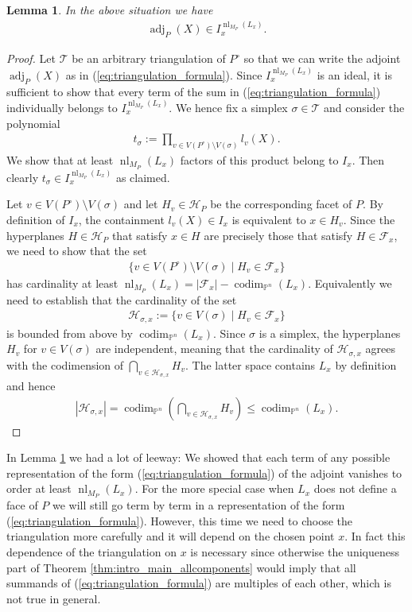 \documentclass[a4paper,10pt]{amsart}
\theoremstyle{definition}
\theoremstyle{plain}
\newtheorem{lem}[defin]{Lemma}
\newcommand{\codim}{\operatorname{codim}}
\newcommand{\adj}{\operatorname{adj}} %
\newcommand{\nl}{\operatorname{nl}}
\newcommand{\cF}{{\mathcal F}}
\newcommand{\cH}{{\mathcal H}}
\newcommand{\cT}{{\mathcal T}}
\newcommand{\pp}{\mathbb{P}}
\begin{document}
\begin{lem}
\label{lem:existence_weak_vanishing}
    In the above situation we have 
    \begin{align*}
        \adj_P(X)\in I_x^{\nl_{M_P}(L_x)}.
     \end{align*}
\end{lem}
\begin{proof}
    Let $\cT$ be an arbitrary triangulation of $P^\circ$ so that we can write the adjoint $\adj_P(X)$ as in (\ref{eq:triangulation_formula}). Since $I_x^{\nl_{M_P}(L_x)}$ is an ideal, it is sufficient to show that every term of the sum in  (\ref{eq:triangulation_formula}) individually belongs to $I_x^{\nl_{M_P}(L_x)}$. We hence fix a simplex $\sigma \in \cT$ and consider the polynomial \begin{align*}
        t_\sigma:=\prod_{v\in V(P^\circ)\setminus V(\sigma)}l_v(X).
    \end{align*}
    We show that at least $\nl_{M_P}(L_x)$ factors of this product belong to $I_x$. Then clearly $t_\sigma\in I_x^{\nl_{M_P}(L_x)}$ as claimed.

    Let $v\in V(P^\circ)\setminus V(\sigma)$ and let $H_v\in \cH_P$ be the corresponding facet of $P$. By definition of $I_x$, the containment $l_v(X)\in I_x$ is equivalent to $x\in H_v$. Since the hyperplanes $H\in \cH_P$ that satisfy $x\in H$ are precisely those that satisfy $H\in \cF_x$, we need to show that the set \begin{align*}
        \{v \in V(P^\circ)\setminus V(\sigma)\mid H_v \in \cF_x\}
    \end{align*}
    has cardinality at least $\nl_{M_P}(L_x)=|\cF_x|-\codim_{\pp^n}(L_x)$. Equivalently we need to establish that the cardinality of the set \begin{align*}
       \cH_{\sigma,x}:= \{v \in V(\sigma)\mid H_v\in \cF_x\} 
    \end{align*}
    is bounded from above by $\codim_{\pp^n}(L_x)$. Since $\sigma$ is a simplex, the hyperplanes $H_v$ for $v\in V(\sigma)$ are independent, meaning that the cardinality of $\cH_{\sigma,x}$ agrees with the codimension of $\bigcap_{v\in\cH_{\sigma,x}}H_v$. The latter space contains $L_x$ by definition and hence \begin{align*}
        |\cH_{\sigma,x}|=\codim_{\pp^n}(\bigcap_{v\in\cH_{\sigma,x}}H_v)\leq \codim_{\pp^n}(L_x).
    \end{align*}
\end{proof}

In Lemma \ref{lem:existence_weak_vanishing} we had a lot of leeway: We showed that each term of any possible representation of the form (\ref{eq:triangulation_formula}) of the adjoint vanishes to order at least $\nl_{M_P}(L_x)$. For the more special case when $L_x$ does not define a face of $P$ we will still go term by term in a representation of the form (\ref{eq:triangulation_formula}). However, this time we need to choose the triangulation more carefully and it will depend on the chosen point $x$. In fact this dependence of the triangulation on $x$ is necessary since otherwise the uniqueness part of Theorem \ref{thm:intro_main_allcomponents} would imply that all summands of (\ref{eq:triangulation_formula}) are multiples of each other, which is not true in general.
\end{document}
